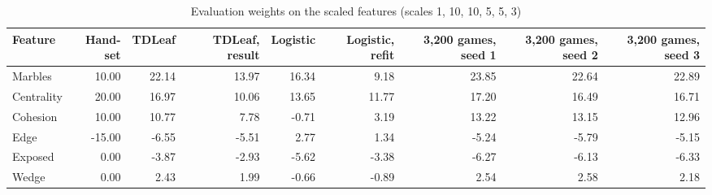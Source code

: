 \begin{table}[!htbp]
\centering\caption{Evaluation weights on the scaled features (scales 1, 10, 10, 5, 5, 3)}\label{tab:weights}
\scriptsize
\begin{tabular}{@{}lrrrrrrrr@{}}
\toprule
Feature & Hand-set & TDLeaf & TDLeaf, result & Logistic & Logistic, refit & 3,200 games, seed 1 & 3,200 games, seed 2 & 3,200 games, seed 3 \\
\midrule
Marbles & 10.00 & 22.14 & 13.97 & 16.34 & 9.18 & 23.85 & 22.64 & 22.89 \\
Centrality & 20.00 & 16.97 & 10.06 & 13.65 & 11.77 & 17.20 & 16.49 & 16.71 \\
Cohesion & 10.00 & 10.77 & 7.78 & -0.71 & 3.19 & 13.22 & 13.15 & 12.96 \\
Edge & -15.00 & -6.55 & -5.51 & 2.77 & 1.34 & -5.24 & -5.79 & -5.15 \\
Exposed & 0.00 & -3.87 & -2.93 & -5.62 & -3.38 & -6.27 & -6.13 & -6.33 \\
Wedge & 0.00 & 2.43 & 1.99 & -0.66 & -0.89 & 2.54 & 2.58 & 2.18 \\
\bottomrule
\end{tabular}
\end{table}
